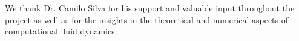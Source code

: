 \documentclass[fleqn,12pt]{NTFD} %
\newlength{\tocsep}
\begin{document}
We thank Dr. Camilo Silva for his support and valuable input throughout the project as well as for the insights in the theoretical and numerical aspects of computational fluid dynamics.






\end{document}
